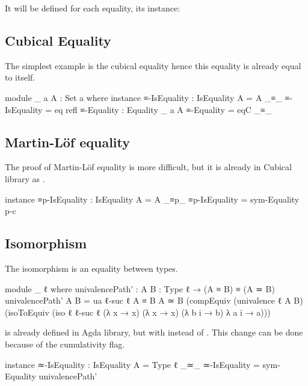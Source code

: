 \documentclass{article}
\begin{document}
It will be defined for each equality, its instance:

\subsection{Cubical Equality}

The simplest example is the cubical equality hence this equality is already equal to itself.

\begin{code}
module _ {a} {A : Set a} where
  instance
    ≡-IsEquality : IsEquality {A = A} _≡_
    ≡-IsEquality = eq refl
  ≡-Equality : Equality {_} {a} {A}
  ≡-Equality = eqC _≡_

\end{code}

\subsection{Martin-Löf equality}

The proof of Martin-Löf equality is more difficult, but it is already in Cubical library as .

\begin{code}
  instance
    ≡p-IsEquality : IsEquality {A = A} _≡p_
    ≡p-IsEquality = sym-Equality p-c
\end{code}

\subsection{Isomorphism}

The isomorphism is an equality between types.

\begin{code}
module _ {ℓ} where
  univalencePath' : {A B : Type ℓ} → (A ≡ B) ≡ (A ≃ B)
  univalencePath' {A} {B} =
    ua {ℓ-suc ℓ} {A ≡ B} {A ≃ B} (compEquiv (univalence {ℓ} {A} {B})
    (isoToEquiv (iso {ℓ} {ℓ-suc ℓ}
    (λ x → x) (λ x → x) (λ b i → b) λ a i → a)))
\end{code}

 is already defined in Agda library, but with  instead of
. This change can be done because of the cumulativity flag.

\begin{code}
  instance
    ≃-IsEquality : IsEquality
      {A = Type ℓ} _≃_
    ≃-IsEquality = sym-Equality univalencePath'
\end{code}
\end{document}
